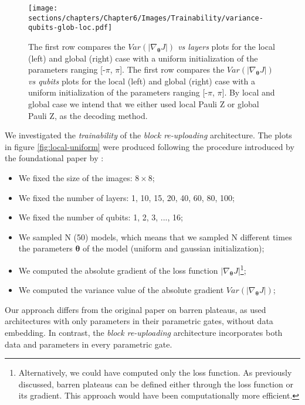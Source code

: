 \begin{figure}[h]
    \centering
    \texttt{[image: sections/chapters/Chapter6/Images/Trainability/variance-qubits-glob-loc.pdf]}
    \caption{The first row compares the \textit{$Var(|\nabla_{\bm{\theta}}J|)$ vs layers} plots for the local (left)
    and global (right) case with a uniform initialization of the parameters ranging [-$\pi$, $\pi$].
    The first row compares the \textit{$Var(|\nabla_{\bm{\theta}}J|)$ vs qubits} plots for the local (left)
    and global (right) case with a uniform initialization of the parameters ranging [-$\pi$, $\pi$].
    By local and global case we intend that we either used local Pauli Z or global Pauli Z, as the 
    decoding method.}
    \label{fig:uniform-init}
\end{figure}

We investigated the \textit{trainability} of the \textit{block re-uploading} architecture. 
The plots in figure \ref{fig:local-uniform} were produced following the procedure introduced by 
the foundational paper by \cite{McClean_2018}:

\begin{itemize}
    \item We fixed the size of the images: $8\times8$;
    \item We fixed the number of layers: 1, 10, 15, 20, 40, 60, 80, 100;
    \item We fixed the number of qubits: 1, 2, 3, ..., 16;
    \item We sampled N (50) models, which means that we sampled N different times the parameters 
    $\bm{\theta}$ of the model (uniform and gaussian initialization);
    \item We computed the absolute gradient of the loss function $|\nabla_{\bm{\theta}}J|$\footnote[1]{
        Alternatively, we could have computed only the loss function. As previously discussed, 
        barren plateaus can be defined either through the loss function or its gradient. 
        This approach would have been computationally more efficient.
    };
    \item We computed the variance value of the absolute gradient $Var(|\nabla_{\bm{\theta}}J|)$;
\end{itemize}

Our approach differs from the original paper on barren plateaus, as \cite{McClean_2018} 
used architectures with only parameters in their parametric gates, without data embedding. 
In contrast, the \textit{block re-uploading} architecture incorporates both data and parameters 
in every parametric gate.\\

